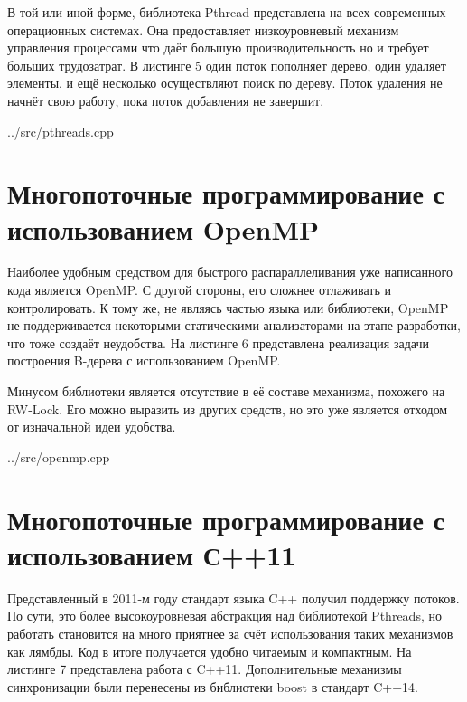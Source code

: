 \documentclass[a4paper, 12pt]{report}		%
\begin{document}
В той или иной форме, библиотека Pthread представлена на всех современных операционных системах. Она предоставляет низкоуровневый механизм управления процессами что даёт большую производительность но и требует больших трудозатрат. В листинге 5 один поток пополняет дерево, один удаляет элементы, и ещё несколько осуществляют поиск по дереву. Поток удаления не начнёт свою работу, пока поток добавления не завершит.


{../src/pthreads.cpp}


\chapter*{Многопоточные программирование с использованием OpenMP}

Наиболее удобным средством для быстрого распараллеливания уже написанного кода является OpenMP. С другой стороны, его сложнее отлаживать и контролировать. К тому же, не являясь частью языка или библиотеки, OpenMP не поддерживается некоторыми статическими анализаторами на этапе разработки, что тоже создаёт неудобства. На листинге 6 представлена реализация задачи построения B-дерева с использованием OpenMP.

Минусом библиотеки является отсутствие в её составе механизма, похожего на RW-Lock. Его можно выразить из других средств, но это уже является отходом от изначальной идеи удобства.


{../src/openmp.cpp}


\chapter*{Многопоточные программирование с использованием С++11}

Представленный в 2011-м году стандарт языка C++ получил поддержку потоков. По сути, это более высокоуровневая абстракция над библиотекой Pthreads, но работать становится на много приятнее за счёт использования таких механизмов как лямбды. Код в итоге получается удобно читаемым и компактным. На листинге 7 представлена работа с C++11. Дополнительные механизмы синхронизации были перенесены из библиотеки boost в стандарт C++14.
\end{document}
